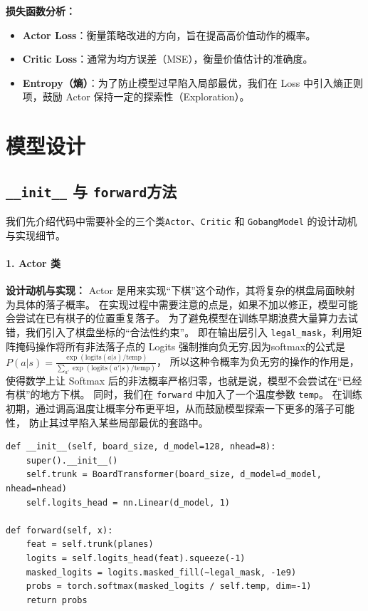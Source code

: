 \documentclass{article}
\begin{document}
\textbf{损失函数分析：}
\begin{itemize}
    \item \textbf{Actor Loss}：衡量策略改进的方向，旨在提高高价值动作的概率。
    \item \textbf{Critic Loss}：通常为均方误差（MSE），衡量价值估计的准确度。
    \item \textbf{Entropy（熵）}：为了防止模型过早陷入局部最优，我们在 Loss 中引入熵正则项，鼓励 Actor 保持一定的探索性（Exploration）。
\end{itemize}

\section{模型设计}

\subsection{\texttt{\_\_init\_\_} 与 \texttt{forward}方法}
我们先介绍代码中需要补全的三个类\texttt{Actor}、\texttt{Critic} 和 \texttt{GobangModel} 的设计动机与实现细节。
\paragraph{1. Actor 类}
\textbf{设计动机与实现：} Actor 是用来实现“下棋”这个动作，其将复杂的棋盘局面映射为具体的落子概率。
在实现过程中需要注意的点是，如果不加以修正，模型可能会尝试在已有棋子的位置重复落子。
为了避免模型在训练早期浪费大量算力去试错，我们引入了棋盘坐标的“合法性约束”。
即在输出层引入 \texttt{legal\_mask}，利用矩阵掩码操作将所有非法落子点的 Logits 强制推向负无穷,因为softmax的公式是
$P(a|s) = \frac{\exp(\text{logits}(a|s) / \text{temp})}{\sum_{a'} \exp(\text{logits}(a'|s) / \text{temp})}$，
所以这种令概率为负无穷的操作的作用是，使得数学上让 Softmax 后的非法概率严格归零，也就是说，模型不会尝试在“已经有棋”的地方下棋。
同时，我们在 \texttt{forward} 中加入了一个温度参数 \texttt{temp}。
在训练初期，通过调高温度让概率分布更平坦，从而鼓励模型探索一下更多的落子可能性，
防止其过早陷入某些局部最优的套路中。

\begin{lstlisting}[caption=Actor 类的核心实现]
def __init__(self, board_size, d_model=128, nhead=8):
    super().__init__()
    self.trunk = BoardTransformer(board_size, d_model=d_model, nhead=nhead)
    self.logits_head = nn.Linear(d_model, 1)

def forward(self, x):
    feat = self.trunk(planes)
    logits = self.logits_head(feat).squeeze(-1)
    masked_logits = logits.masked_fill(~legal_mask, -1e9)
    probs = torch.softmax(masked_logits / self.temp, dim=-1)
    return probs
\end{lstlisting}
\end{document}
